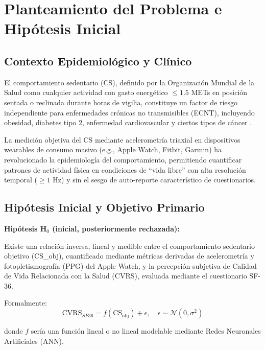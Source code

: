 \documentclass[12pt,letterpaper,twoside]{report}
\begin{document}
\chapter{Planteamiento del Problema e Hipótesis Inicial}

\section{Contexto Epidemiológico y Clínico}

El comportamiento sedentario (CS), definido por la Organización Mundial de la Salud como cualquier actividad con gasto energético $\leq 1.5$ METs en posición sentada o reclinada durante horas de vigilia, constituye un factor de riesgo independiente para enfermedades crónicas no transmisibles (ECNT), incluyendo obesidad, diabetes tipo 2, enfermedad cardiovascular y ciertos tipos de cáncer \cite{who2020}.

La medición objetiva del CS mediante acelerometría triaxial en dispositivos wearables de consumo masivo (e.g., Apple Watch, Fitbit, Garmin) ha revolucionado la epidemiología del comportamiento, permitiendo cuantificar patrones de actividad física en condiciones de ``vida libre'' con alta resolución temporal ($\geq 1$ Hz) y sin el sesgo de auto-reporte característico de cuestionarios.

\section{Hipótesis Inicial y Objetivo Primario}

\begin{hipotesisbox}
\textbf{Hipótesis H$_0$ (inicial, posteriormente rechazada):}

Existe una relación inversa, lineal y medible entre el comportamiento sedentario objetivo (CS\_obj), cuantificado mediante métricas derivadas de acelerometría y fotopletismografía (PPG) del Apple Watch, y la percepción subjetiva de Calidad de Vida Relacionada con la Salud (CVRS), evaluada mediante el cuestionario SF-36.

Formalmente:
\begin{equation}
\text{CVRS}_{SF36} = f(\text{CS}_{\text{obj}}) + \epsilon, \quad \epsilon \sim \mathcal{N}(0, \sigma^2)
\end{equation}

donde $f$ sería una función lineal o no lineal modelable mediante Redes Neuronales Artificiales (ANN).
\end{hipotesisbox}
\end{document}
